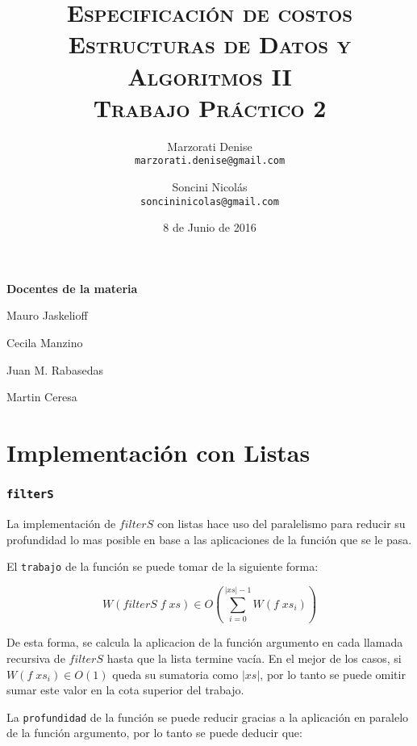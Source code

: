\documentclass[a4paper,10pt]{article}
\author{
    Marzorati Denise \\
    \texttt{marzorati.denise@gmail.com}
    \and Soncini Nicolás \\
    \texttt{soncininicolas@gmail.com}
}
\date{
    8 de Junio de 2016
}
\title{
    \Huge \textsc{Especificación de costos} \\
    \large \textsc{Estructuras de Datos y Algoritmos II} \\
    \textsc{Trabajo Práctico 2}
}
\begin{document}
\bigskip
\bigskip
\bigskip

\maketitle

\thispagestyle{empty}

\begin{center}
\large \bf Docentes de la materia
\end{center}

\begin{center}
Mauro Jaskelioff

Cecila Manzino

Juan M. Rabasedas

Martin Ceresa
\end{center}

\newpage{}


\part*{Implementación con Listas}


\section*{\texttt{filterS}}

    La implementación de $filterS$ con listas hace uso del paralelismo para
reducir su profundidad lo mas posible en base a las aplicaciones de la función 
que se le pasa.

    El \texttt{trabajo} de la función se puede tomar de la siguiente forma:

\begin{equation*}
    W \left(filterS\; f \;xs\right) \in
    O \left( \sum_{i=0}^{\vert xs \vert -1} W \left( f\; xs_i \right) \right)
\end{equation*}

De esta forma, se calcula la aplicacion de la función argumento en cada
llamada recursiva de $filterS$ hasta que la lista termine vacía.
En el mejor de los casos, si $W \left( f\; xs_i \right) \in O \left( 1 \right)$ queda
su sumatoria como $\vert xs \vert$, por lo tanto se puede omitir sumar este valor
en la cota superior del trabajo.

\bigskip

La \texttt{profundidad} de la función se puede reducir gracias a la aplicación
en paralelo de la función argumento, por lo tanto se puede deducir que:
\end{document}
